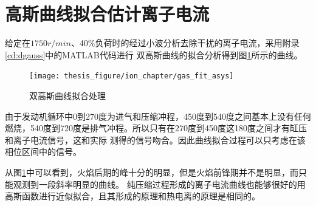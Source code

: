 \section{高斯曲线拟合估计离子电流}
给定在$1750r/min$、40\%负荷时的经过小波分析去除干扰的离子电流，采用附录\ref{cd:dgauss}中的MATLAB代码进行
双高斯曲线的拟合分析得到图\ref{fig:gas_fit_asys}所示的曲线。
\begin{figure}[htb]
	\centering
	\texttt{[image: thesis\_figure/ion\_chapter/gas\_fit\_asys]}
	\caption{\label{fig:gas_fit_asys}双高斯曲线拟合处理}
\end{figure}
由于发动机循环中0到270度为进气和压缩冲程，450度到540度之间基本上没有任何燃烧，540度到720度是排气冲程。所以只有在270度到450度这180度之间才有缸压和离子电流信号，这和实际
测得的信号吻合。因此曲线拟合过程可以只考虑在该相位区间中的信号。\par
从图\ref{fig:gas_fit_asys}中可以看到，火焰后期的峰十分的明显，但是火焰前锋期并不是明显，而只能观测到一段斜率明显的曲线。
纯压缩过程形成的离子电流曲线也能够很好的用高斯函数进行近似拟合，且其形成的原理和热电离的原理是相同的。
